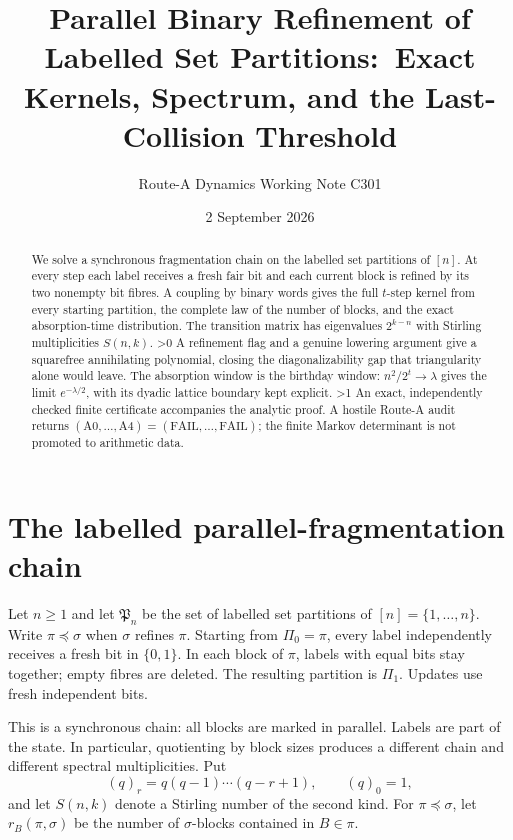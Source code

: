 \documentclass[10pt]{article}
\title{Parallel Binary Refinement of Labelled Set Partitions:\
Exact Kernels, Spectrum, and the Last-Collision Threshold}
\author{Route-A Dynamics Working Note C301}
\date{2 September 2026}
\providecommand{\CRevisionRound}{2}
\newcommand{\Part}{\mathfrak P}
\newcommand{\fall}[2]{(#1)_{#2}}
\begin{document}
\maketitle

\begin{abstract}
We solve a synchronous fragmentation chain on the labelled set partitions of
$[n]$.  At every step each label receives a fresh fair bit and each current
block is refined by its two nonempty bit fibres.  A coupling by binary words
gives the full $t$-step kernel from every starting partition, the complete
law of the number of blocks, and the exact absorption-time distribution.
The transition matrix has eigenvalues $2^{k-n}$ with Stirling multiplicities
$S(n,k)$.
\ifnum\CRevisionRound>0
A refinement flag and a genuine lowering argument give a squarefree
annihilating polynomial, closing the diagonalizability gap that triangularity
alone would leave.  The absorption window is the birthday window:
$n^2/2^t\to\lambda$ gives the limit $e^{-\lambda/2}$, with its dyadic lattice
boundary kept explicit.
\fi
\ifnum\CRevisionRound>1
An exact, independently checked finite certificate accompanies the analytic
proof.  A hostile Route-A audit returns
$(\mathrm{A0},\ldots,\mathrm{A4})=(\mathrm{FAIL},\ldots,\mathrm{FAIL})$;
the finite Markov determinant is not promoted to arithmetic data.
\fi
\end{abstract}

\section{The labelled parallel-fragmentation chain}

Let $n\geq1$ and let $\Part_n$ be the set of labelled set partitions of
$[n]=\{1,\ldots,n\}$.  Write $\pi\preceq\sigma$ when $\sigma$ refines
$\pi$.  Starting from $\Pi_0=\pi$, every label independently receives a
fresh bit in $\{0,1\}$.  In each block of $\pi$, labels with equal bits stay
together; empty fibres are deleted.  The resulting partition is $\Pi_1$.
Updates use fresh independent bits.

This is a synchronous chain: all blocks are marked in parallel.  Labels are
part of the state.  In particular, quotienting by block sizes produces a
different chain and different spectral multiplicities.  Put
\[
  \fall qr=q(q-1)\cdots(q-r+1),\qquad \fall q0=1,
\]
and let $S(n,k)$ denote a Stirling number of the second kind.  For
$\pi\preceq\sigma$, let $r_B(\pi,\sigma)$ be the number of $\sigma$-blocks
contained in $B\in\pi$.
\end{document}
